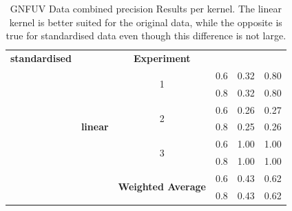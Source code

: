 \documentclass{mpaper}
\begin{document}
\begin{table}[]
\begin{tabular}{|c|c|cccc|}
\textbf{standardised}           &                       & \multicolumn{1}{c|}{\textbf{Experiment}}                        & \multicolumn{1}{c|}{}                   & \multicolumn{1}{l}{}              & \multicolumn{1}{l|}{}               \\ \cline{3-6} 
                                & \multicolumn{1}{l|}{} & \multicolumn{1}{c|}{\multirow{2}{*}{1}}                         & \multicolumn{1}{c|}{0.6}                & 0.32                              & 0.80                                \\
                                &                       & \multicolumn{1}{c|}{}                                           & \multicolumn{1}{c|}{0.8}                & 0.32                              & 0.80                                \\ \cline{3-6} 
                                &                       & \multicolumn{1}{c|}{\multirow{2}{*}{2}}                         & \multicolumn{1}{c|}{0.6}                & 0.26                              & 0.27                                \\
\multicolumn{1}{|l|}{}          & \textbf{linear}       & \multicolumn{1}{c|}{}                                           & \multicolumn{1}{c|}{0.8}                & 0.25                              & 0.26                                \\ \cline{3-6} 
                                &                       & \multicolumn{1}{c|}{\multirow{2}{*}{3}}                         & \multicolumn{1}{c|}{0.6}                & 1.00                              & 1.00                                \\
                                &                       & \multicolumn{1}{c|}{}                                           & \multicolumn{1}{c|}{0.8}                & 1.00                              & 1.00                                \\ \cline{3-6} 
                                &                       & \multicolumn{1}{c|}{\multirow{2}{*}{\textbf{Weighted Average}}} & \multicolumn{1}{c|}{0.6}                & 0.43                              & 0.62                                \\
                                &                       & \multicolumn{1}{c|}{}                                           & \multicolumn{1}{c|}{0.8}                & 0.43                              & 0.62                                \\ \hline
\end{tabular}
\caption{\label{tab:gnfuv_combined_precision_per_kernel} GNFUV Data combined precision Results per kernel. The linear kernel is better suited for the original data, while the opposite is true for standardised data even though this difference is not large. }
\end{table}
\end{document}
